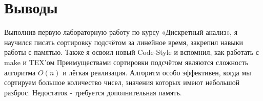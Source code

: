 \section{Выводы}

Выполнив первую лабораторную работу по курсу «Дискретный анализ», я научился
писать сортировку подсчётом за линейное время, закрепил навыки работы с памятью.
Также я освоил новый Code-Style и вспомнил, как работать с make и TEX’ом
Преимуществами сортировки подсчётом являются сложность алгоритма $O(n)$ и лёгкая реализация. 
Алгоритм особо эффективен, когда мы сортируем большое количество чисел, значения которых имеют небольшой разброс. Недостаток - требуется дополнительная память.

\pagebreak
